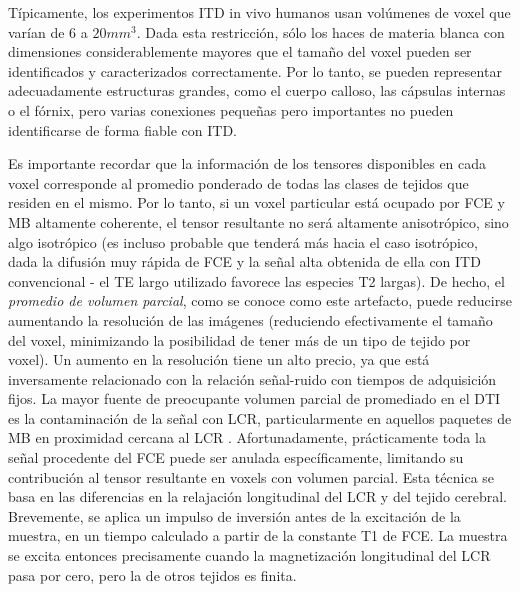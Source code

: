 \documentclass[12pt,a5,twoside]{book}
\begin{document}
Típicamente, los experimentos ITD in vivo humanos usan volúmenes de voxel que varían de 6 a $20 mm^{3}$. Dada esta restricción, sólo los haces de materia blanca con dimensiones considerablemente mayores que el tamaño del voxel pueden ser identificados y caracterizados correctamente. Por lo tanto, se pueden representar adecuadamente estructuras grandes, como el cuerpo calloso, las cápsulas internas o el fórnix, pero varias conexiones pequeñas pero importantes no pueden identificarse de forma fiable con ITD.

Es importante recordar que la información de los tensores disponibles en cada voxel corresponde al promedio ponderado de todas las clases de tejidos que residen en el mismo. Por lo tanto, si un voxel particular está ocupado por FCE y MB altamente coherente, el tensor resultante no será altamente anisotrópico, sino algo isotrópico (es incluso probable que tenderá más hacia el caso isotrópico, dada la difusión muy rápida de FCE y la señal alta obtenida de ella con ITD convencional - el TE largo utilizado favorece las especies T2 largas). De hecho, el {\it promedio de volumen parcial}, como se conoce como este artefacto, puede reducirse aumentando la resolución de las imágenes (reduciendo efectivamente el tamaño del voxel, minimizando la posibilidad de tener más de un tipo de tejido por voxel). Un aumento en la resolución tiene un alto precio, ya que está inversamente relacionado con la relación señal-ruido con tiempos de adquisición fijos. La mayor fuente de preocupante volumen parcial de promediado en el DTI es la contaminación de la señal con LCR, particularmente en aquellos paquetes de MB en proximidad cercana al LCR \citep{Concha_2005}. Afortunadamente, prácticamente toda la señal procedente del FCE puede ser anulada específicamente, limitando su contribución al tensor resultante en voxels con volumen parcial. Esta técnica se basa en las diferencias en la relajación longitudinal del LCR y del tejido cerebral. Brevemente, se aplica un impulso de inversión antes de la excitación de la muestra, en un tiempo calculado a partir de la constante T1 de FCE. La muestra se excita entonces precisamente cuando la magnetización longitudinal del LCR pasa por cero, pero la de otros tejidos es finita.
\end{document}
